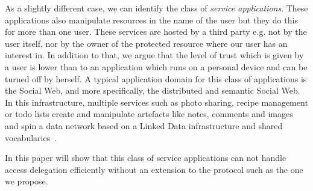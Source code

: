 \documentclass[a4paper]{llncs}
\begin{document}
As a slightly different case, we can identify the class of \textit{service applications}.
These applications also manipulate resources in the name of the user but they do this for more than one user.
These services are hosted by a third party e.g. not by the user itself, nor by the owner of the protected resource where our user has an interest in.
In addition to that, we argue that the level of trust which is given by a user is lower than to an application which runs on a personal device and can be turned off by herself.
A typical application domain for this class of applications is the Social Web, and more specifically, the distributed and semantic Social Web.
In this infrastructure, multiple services such as photo sharing, recipe management or todo lists create and manipulate artefacts like notes, comments and images and spin a data network based on a Linked Data infrastructure and shared vocabularies~\cite{tramp-s-2012--a}.

In this paper will show that this class of service applications can not handle access delegation efficiently without an extension to the protocol such as the one we propose.





\end{document}
